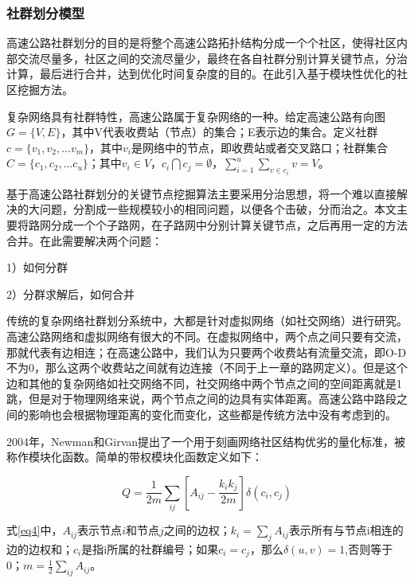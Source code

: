 			\subsubsection{社群划分模型}
				高速公路社群划分的目的是将整个高速公路拓扑结构分成一个个社区，使得社区内部交流尽量多，社区之间的交流尽量少，最终在各自社群分别计算关键节点，分治计算，最后进行合并，达到优化时间复杂度的目的。在此引入基于模块性优化的社区挖掘方法。

				复杂网络具有社群特性，高速公路属于复杂网络的一种。给定高速公路有向图$G=\{V,E\}$，其中V代表收费站（节点）的集合；E表示边的集合。定义社群$c=\{v_1,v_2,...v_m\}$，其中$v_i$是网络中的节点，即收费站或者交叉路口；社群集合$C=\{c_1,c_2,...c_u\}$；其中$v_i \in V$，${c_i}\bigcap {{c_j}}  = \emptyset$，$\sum\limits_{i = 1}^u {\sum\limits_{v \in {c_i}} v  = V}$。

				基于高速公路社群划分的关键节点挖掘算法主要采用分治思想，将一个难以直接解决的大问题，分割成一些规模较小的相同问题，以便各个击破，分而治之。本文主要将路网分成一个个子路网，在子路网中分别计算关键节点，之后再用一定的方法合并。在此需要解决两个问题：

					1）如何分群

					2）分群求解后，如何合并

				传统的复杂网络社群划分系统中，大都是针对虚拟网络（如社交网络）进行研究。高速公路网络和虚拟网络有很大的不同。在虚拟网络中，两个点之间只要有交流，那就代表有边相连；在高速公路中，我们认为只要两个收费站有流量交流，即O-D不为0，那么这两个收费站之间就有边连接（不同于上一章的路网定义）。但是这个边和其他的复杂网络如社交网络不同，社交网络中两个节点之间的空间距离就是1跳，但是对于物理网络来说，两个节点之间的边具有实体距离。高速公路中路段之间的影响也会根据物理距离的变化而变化，这些都是传统方法中没有考虑到的。

				2004年，Newman和Girvan\parencite{NewmanBasic}提出了一个用于刻画网络社区结构优劣的量化标准，被称作模块化函数。简单的带权模块化函数定义如下：

				\begin{equation}
				Q = \frac{1}{{2m}}\sum\limits_{ij} {[{A_{ij}} - \frac{{{k_i}{k_j}}}{{2m}}]\delta ({c_i},{c_j})}
				\label{eq4}
				\end{equation}

				式\ref{eq4}中，$A_{ij}$表示节点$i$和节点$j$之间的边权；$k_i=\sum\limits_{j} {A_{ij}}$表示所有与节点i相连的边的边权和；$c_i$是指i所属的社群编号；如果$c_i=c_j$，那么$\delta (u,v)=1$,否则等于0；$m=\frac{1}{{2}}\sum\limits_{ij} {A_{ij}}$。

